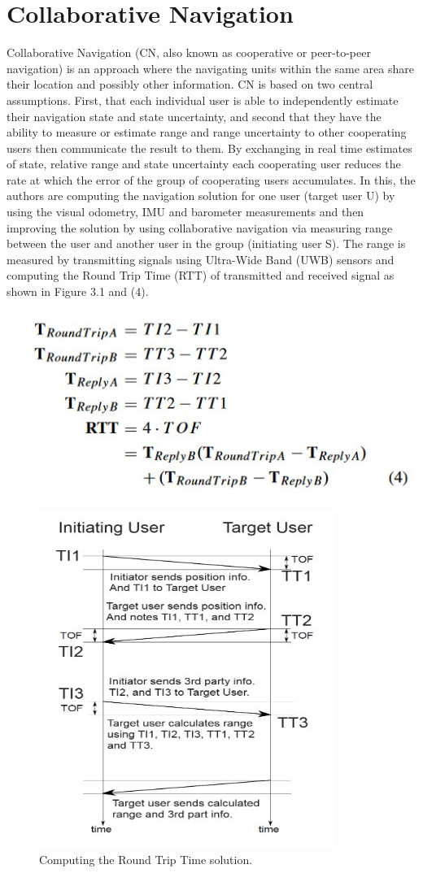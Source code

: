 \chapter{Collaborative Navigation}
Collaborative Navigation (CN, also known as cooperative or
peer-to-peer navigation) is an approach where the navigating
units within the same area share their location and possibly
other information. CN is based on two central assumptions.
First, that each individual user is able to independently estimate their navigation state and state uncertainty, and second
that they have the ability to measure or estimate range and
range uncertainty to other cooperating users then communicate
the result to them. By exchanging in real time estimates of
state, relative range and state uncertainty each cooperating user
reduces the rate at which the error of the group of cooperating
users accumulates. In this, the authors are computing the
navigation solution for one user (target user U) by using
the visual odometry, IMU and barometer measurements and
then improving the solution by using collaborative navigation
via measuring range between the user and another user in
the group (initiating user S). The range is measured by
transmitting signals using Ultra-Wide Band (UWB) sensors
and computing the Round Trip Time (RTT) of transmitted and
received signal as shown in Figure 3.1 and (4).
\begin{center}
   \includegraphics{eq4.jpg}
   \end{center}
\begin{figure}
    \centering
    \includegraphics{fig8.jpg}
    \caption{Computing the Round Trip Time solution.}
    
\end{figure}   
